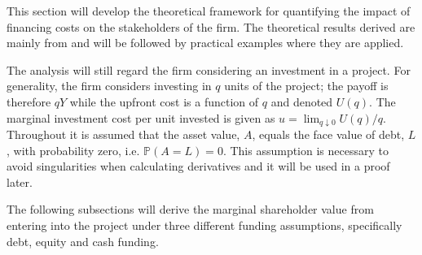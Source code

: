 \documentclass[../main.tex]{subfiles}
\begin{document}
    This section will develop the theoretical framework for quantifying the impact of financing costs on the stakeholders of the firm.
    The theoretical results derived are mainly from \textcite{ADS2019} and will be followed by practical examples where they are applied.


    The analysis will still regard the firm considering an investment in a project.
    For generality, the firm considers investing in $q$ units of the project; 
    the payoff is therefore $qY$ while the upfront cost is a function of $q$ and denoted $U(q)$. 
    The marginal investment cost per unit invested is given as 
    $u = \lim_{q\downarrow 0} U(q) / q$.
    Throughout it is assumed that the asset value, $A$, equals the face value of debt, $L$, 
    with probability zero, i.e. $\mathbb{P}\left(A = L\right) = 0$.
    This assumption is necessary to avoid singularities when calculating derivatives
    and it will be used in a proof later.

    The following subsections will derive the marginal shareholder value from entering into the project
    under three different funding assumptions, specifically debt, equity and cash funding.
\end{document}
